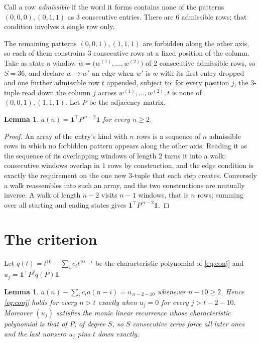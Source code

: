 \documentclass[11pt,a4paper]{article}
\theoremstyle{plain}
\newtheorem{lemma}[theorem]{Lemma}
\theoremstyle{definition}
\begin{document}
Call a row \emph{admissible} if the word it forms contains none of the patterns
$(0,0,0), (0,1,1)$ as $3$ consecutive entries. There are $6$ admissible rows; that condition
involves a single row only.

The remaining patterns $(0,0,1), (1,1,1)$ are forbidden along the other axis, so each of them
constrains $3$ consecutive rows at a fixed position of the column. Take as state a
window $w=\bigl(w^{(1)},\dots,w^{(2)}\bigr)$ of $2$ consecutive admissible
rows, so $S=36$, and declare $w\to w'$ an edge when $w'$ is $w$ with its first entry
dropped and one further admissible row $t$ appended, subject to: for every position
$j$, the $3$-tuple read down the column $j$ across $w^{(1)},\dots,w^{(2)},t$
is none of $(0,0,1), (1,1,1)$. Let $P$ be the adjacency matrix.

\begin{lemma}\label{lem:walk}
$a(n)=\mathbf{1}^{\!\top}P^{\,n-2}\mathbf{1}$ for every $n\ge2$.
\end{lemma}

\begin{proof}
An array of the entry's kind with $n$ rows is a sequence of $n$ admissible rows in
which no forbidden pattern appears along the other axis. Reading it as the sequence of its
overlapping windows of length $2$ turns it into a walk: consecutive windows overlap in
$1$ rows by construction, and the edge condition is exactly the requirement on the one
new $3$-tuple that each step creates. Conversely a walk reassembles into such an array,
and the two constructions are mutually inverse. A walk of length $n-2$ visits $n-1$
windows, that is $n$ rows; summing over all starting and ending states gives
$\mathbf{1}^{\!\top}P^{\,n-2}\mathbf{1}$.
\end{proof}

\section{The criterion}

Let $q(t)=t^{10}-\sum_i c_i t^{10-i}$ be the characteristic polynomial of
\eqref{eq:conj} and $u_j=\mathbf{1}^{\!\top}P^{j}q(P)\mathbf{1}$.

\begin{lemma}\label{lem:crit}
$a(n)-\sum_i c_i a(n-i)=u_{\,n-2-10}$ whenever $n-10\ge2$. Hence
\eqref{eq:conj} holds for every $n>t$ exactly when $u_j=0$ for every
$j>t-2-10$. Moreover $(u_j)$ satisfies the monic linear recurrence whose
characteristic polynomial is that of $P$, of degree $S$, so $S$ consecutive zeros force all
later ones and the last nonzero $u_j$ pins $t$ down exactly.
\end{lemma}
\end{document}
